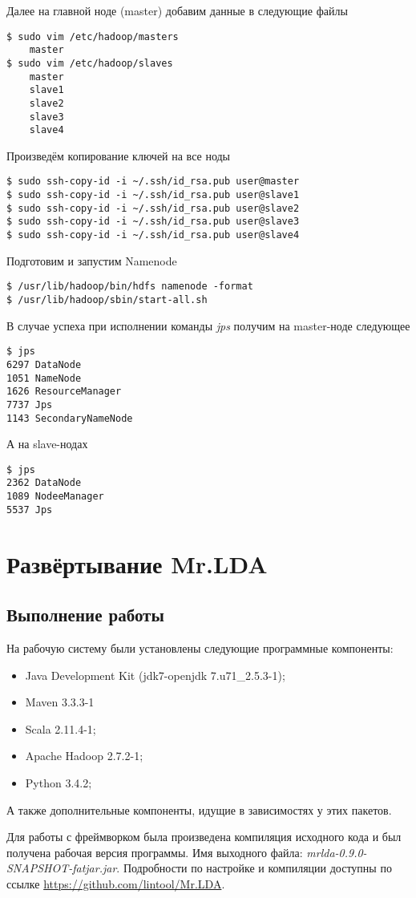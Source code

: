 Далее на главной ноде (master) добавим данные в следующие файлы
\begin{lstlisting}
$ sudo vim /etc/hadoop/masters
    master
$ sudo vim /etc/hadoop/slaves
    master
    slave1
    slave2
    slave3
    slave4
\end{lstlisting}
Произведём копирование ключей на все ноды
\begin{lstlisting}
$ sudo ssh-copy-id -i ~/.ssh/id_rsa.pub user@master
$ sudo ssh-copy-id -i ~/.ssh/id_rsa.pub user@slave1
$ sudo ssh-copy-id -i ~/.ssh/id_rsa.pub user@slave2
$ sudo ssh-copy-id -i ~/.ssh/id_rsa.pub user@slave3
$ sudo ssh-copy-id -i ~/.ssh/id_rsa.pub user@slave4
\end{lstlisting}
Подготовим и запустим Namenode
\begin{lstlisting}
$ /usr/lib/hadoop/bin/hdfs namenode -format
$ /usr/lib/hadoop/sbin/start-all.sh
\end{lstlisting}
В случае успеха при исполнении команды \emph{jps} получим на master-ноде следующее
\begin{lstlisting}
$ jps
6297 DataNode
1051 NameNode
1626 ResourceManager
7737 Jps
1143 SecondaryNameNode
\end{lstlisting}
А на slave-нодах
\begin{lstlisting}
$ jps
2362 DataNode
1089 NodeeManager
5537 Jps
\end{lstlisting}

\section{Развёртывание Mr.LDA}
\subsection{Выполнение работы}
На рабочую систему были установлены следующие программные компоненты:
\begin{itemize}
    \item Java Development Kit (jdk7-openjdk 7.u71\_2.5.3-1);
    \item Maven 3.3.3-1
    \item Scala 2.11.4-1;
    \item Apache Hadoop 2.7.2-1;
    \item Python 3.4.2;
\end{itemize}
А также дополнительные компоненты, идущие в зависимостях у этих пакетов.

Для работы с фреймворком была произведена компиляция исходного кода и был получена рабочая версия программы. Имя выходного файла: 
\emph{mrlda-0.9.0-SNAPSHOT-fatjar.jar}. Подробности по настройке и компиляции доступны по ссылке \url{https://github.com/lintool/Mr.LDA}.

